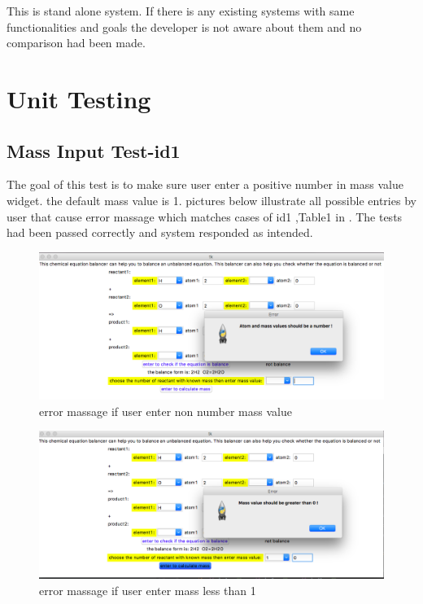 \documentclass[12pt, titlepage]{article}
\begin{document}
This is stand alone system. If there is any existing systems with same functionalities and goals the developer is not aware about them and no comparison had been made.

\section{Unit Testing}\label{unit}

\subsection{Mass Input Test-id1}

The goal of this test is to make sure user enter a positive number in mass value widget. the default mass value is 1. pictures below illustrate all possible entries by user that cause error massage which matches cases of id1 ,Table1 in \cite{SystemVnVPlan}. The tests had been passed correctly and system responded as intended. 

 \begin{figure}[H]
 \begin{center}
 \includegraphics [width=\textwidth]{massnotnumber}
 \caption{\label{ Figure 1:} error massage if user enter non number mass value}
 \end{center}
 \end{figure}
 
\begin{figure}[H]
 \begin{center}
 \includegraphics [width=\textwidth]{massnegative}
 \caption{\label{ Figure 2:} error massage if user enter mass less than 1}
 \end{center}
 \end{figure}
\end{document}
